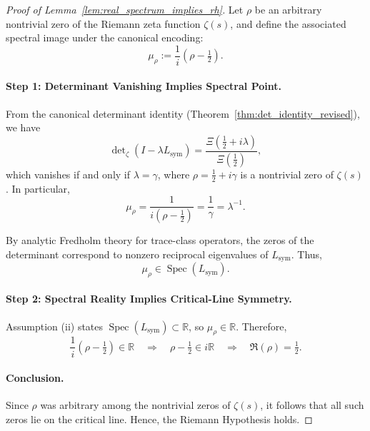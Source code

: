 \begin{proof}[Proof of Lemma~\ref{lem:real_spectrum_implies_rh}]
Let \( \rho \) be an arbitrary nontrivial zero of the Riemann zeta function \( \zeta(s) \), and define the associated spectral image under the canonical encoding:
\[
\mu_\rho := \frac{1}{i}(\rho - \tfrac{1}{2}).
\]

\paragraph{Step 1: Determinant Vanishing Implies Spectral Point.}
From the canonical determinant identity (Theorem~\ref{thm:det_identity_revised}), we have
\[
\det\nolimits_{\zeta}(I - \lambda L_{\mathrm{sym}}) = \frac{\Xi\left( \tfrac{1}{2} + i\lambda \right)}{\Xi\left( \tfrac{1}{2} \right)},
\]
which vanishes if and only if \( \lambda = \gamma \), where \( \rho = \tfrac{1}{2} + i\gamma \) is a nontrivial zero of \( \zeta(s) \). In particular,
\[
\mu_\rho = \frac{1}{i(\rho - \tfrac{1}{2})} = \frac{1}{\gamma} = \lambda^{-1}.
\]

By analytic Fredholm theory for trace-class operators, the zeros of the determinant correspond to nonzero reciprocal eigenvalues of \( L_{\mathrm{sym}} \). Thus,
\[
\mu_\rho \in \operatorname{Spec}(L_{\mathrm{sym}}).
\]

\paragraph{Step 2: Spectral Reality Implies Critical-Line Symmetry.}
Assumption (ii) states \( \operatorname{Spec}(L_{\mathrm{sym}}) \subset \mathbb{R} \), so \( \mu_\rho \in \mathbb{R} \). Therefore,
\[
\frac{1}{i}(\rho - \tfrac{1}{2}) \in \mathbb{R}
\quad \Rightarrow \quad \rho - \tfrac{1}{2} \in i\mathbb{R}
\quad \Rightarrow \quad \Re(\rho) = \tfrac{1}{2}.
\]

\paragraph{Conclusion.}
Since \( \rho \) was arbitrary among the nontrivial zeros of \( \zeta(s) \), it follows that all such zeros lie on the critical line. Hence, the Riemann Hypothesis holds.
\end{proof}
